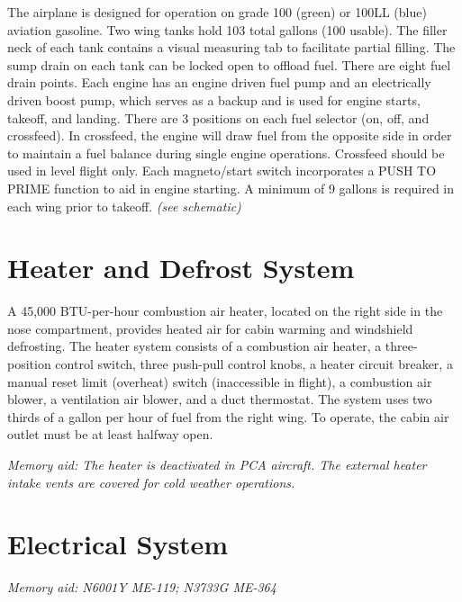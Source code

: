 The airplane is designed for operation on grade 100 (green) or 100LL (blue) aviation gasoline. Two wing tanks hold
103 total gallons (100 usable). The filler neck of each tank contains a visual measuring tab to facilitate partial
filling. The sump drain on each tank can be locked open to offload fuel. There are eight fuel drain points. Each
engine has an engine driven fuel pump and an electrically driven boost pump, which serves as a backup and is used
for engine starts, takeoff, and landing. There are 3 positions on each fuel selector (on, off, and crossfeed). In
crossfeed, the engine will draw fuel from the opposite side in order to maintain a fuel balance during single engine
operations. Crossfeed should be used in level flight only. Each magneto/start switch incorporates a PUSH TO
PRIME function to aid in engine starting. A minimum of 9 gallons is required in each wing prior to takeoff.
\emph{(see schematic)}

\section{Heater and Defrost System}

A 45,000 BTU-per-hour combustion air heater, located on the right side in the nose compartment, provides heated
air for cabin warming and windshield defrosting. The heater system consists of a combustion air heater, a three-
position control switch, three push-pull control knobs, a heater circuit breaker, a manual reset limit (overheat) switch
(inaccessible in flight), a combustion air blower, a ventilation air blower, and a duct thermostat. The system uses
two thirds of a gallon per hour of fuel from the right wing. To operate, the cabin air outlet must be at least halfway
open.

\emph{Memory aid: The heater is deactivated in PCA aircraft. The external heater intake vents are covered for cold weather operations.}

\section{Electrical System}

\emph{Memory aid: N6001Y ME-119; N3733G ME-364}


